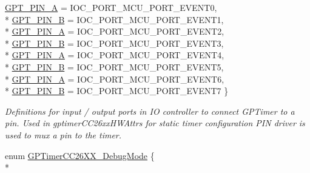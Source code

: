 \begin{DoxyCompactItemize}
\hyperlink{_g_p_timer_c_c26_x_x_8h_ab4a2e82c659e0ea1fa2ae7a852298359a46af9b3278d2116fd4862c7fe19624b7}{G\+P\+T\+\_\+\+P\+I\+N\+\_\+A} = I\+O\+C\+\_\+\+P\+O\+R\+T\+\_\+\+M\+C\+U\+\_\+\+P\+O\+R\+T\+\_\+\+E\+V\+E\+N\+T0, 
\\*
\hyperlink{_g_p_timer_c_c26_x_x_8h_ab4a2e82c659e0ea1fa2ae7a852298359a1e7ba339de898f1572f21424ce125f2d}{G\+P\+T\+\_\+\+P\+I\+N\+\_\+B} = I\+O\+C\+\_\+\+P\+O\+R\+T\+\_\+\+M\+C\+U\+\_\+\+P\+O\+R\+T\+\_\+\+E\+V\+E\+N\+T1, 
\\*
\hyperlink{_g_p_timer_c_c26_x_x_8h_ab4a2e82c659e0ea1fa2ae7a852298359acc7f9d714b4eb87595ebd5a8fdd6ed2f}{G\+P\+T\+\_\+\+P\+I\+N\+\_\+A} = I\+O\+C\+\_\+\+P\+O\+R\+T\+\_\+\+M\+C\+U\+\_\+\+P\+O\+R\+T\+\_\+\+E\+V\+E\+N\+T2, 
\\*
\hyperlink{_g_p_timer_c_c26_x_x_8h_ab4a2e82c659e0ea1fa2ae7a852298359a69db29a9a9029d1fcfabfbf20ba26ee4}{G\+P\+T\+\_\+\+P\+I\+N\+\_\+B} = I\+O\+C\+\_\+\+P\+O\+R\+T\+\_\+\+M\+C\+U\+\_\+\+P\+O\+R\+T\+\_\+\+E\+V\+E\+N\+T3, 
\\*
\hyperlink{_g_p_timer_c_c26_x_x_8h_ab4a2e82c659e0ea1fa2ae7a852298359a48b2ab2ad9e83e67d94421adb06f4aa1}{G\+P\+T\+\_\+\+P\+I\+N\+\_\+A} = I\+O\+C\+\_\+\+P\+O\+R\+T\+\_\+\+M\+C\+U\+\_\+\+P\+O\+R\+T\+\_\+\+E\+V\+E\+N\+T4, 
\\*
\hyperlink{_g_p_timer_c_c26_x_x_8h_ab4a2e82c659e0ea1fa2ae7a852298359a3e1fd803b55127a98c4709cc9e811e70}{G\+P\+T\+\_\+\+P\+I\+N\+\_\+B} = I\+O\+C\+\_\+\+P\+O\+R\+T\+\_\+\+M\+C\+U\+\_\+\+P\+O\+R\+T\+\_\+\+E\+V\+E\+N\+T5, 
\\*
\hyperlink{_g_p_timer_c_c26_x_x_8h_ab4a2e82c659e0ea1fa2ae7a852298359a4b93799cba930f4b538d0f0b3bfee4be}{G\+P\+T\+\_\+\+P\+I\+N\+\_\+A} = I\+O\+C\+\_\+\+P\+O\+R\+T\+\_\+\+M\+C\+U\+\_\+\+P\+O\+R\+T\+\_\+\+E\+V\+E\+N\+T6, 
\\*
\hyperlink{_g_p_timer_c_c26_x_x_8h_ab4a2e82c659e0ea1fa2ae7a852298359aca82a1cd0f9e891472b4f5b09998a597}{G\+P\+T\+\_\+\+P\+I\+N\+\_\+B} = I\+O\+C\+\_\+\+P\+O\+R\+T\+\_\+\+M\+C\+U\+\_\+\+P\+O\+R\+T\+\_\+\+E\+V\+E\+N\+T7
 \}
\begin{DoxyCompactList}\small\item\em Definitions for input / output ports in I\+O controller to connect G\+P\+Timer to a pin. Used in gptimer\+C\+C26xx\+H\+W\+Attrs for static timer configuration P\+I\+N driver is used to mux a pin to the timer. \end{DoxyCompactList}\item 
enum \hyperlink{_g_p_timer_c_c26_x_x_8h_ab4c80c79c9acaf8e482e8244adbae73e}{G\+P\+Timer\+C\+C26\+X\+X\+\_\+\+Debug\+Mode} \{ \\*

\end{DoxyCompactItemize}
